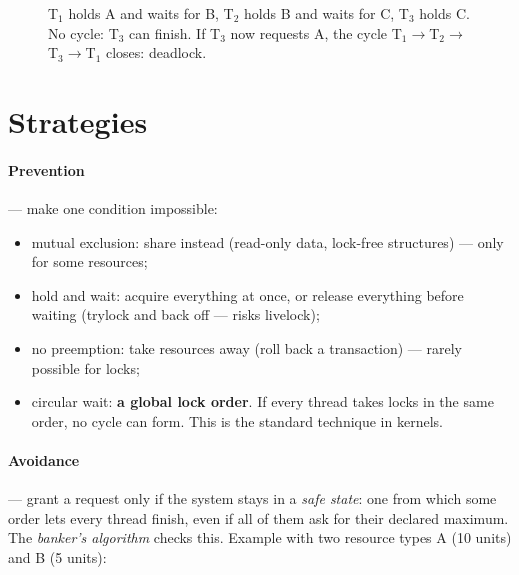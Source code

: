 \begin{figure}[htbp]
\centering
{}
\caption{T$_1$ holds A and waits for B, T$_2$ holds B and waits for C, T$_3$
holds C. No cycle: T$_3$ can finish. If T$_3$ now requests A, the cycle
T$_1\to$T$_2\to$T$_3\to$T$_1$ closes: deadlock.}
\label{fig:rag}
\end{figure}

\section{Strategies}

\paragraph{Prevention} --- make one condition impossible:
\begin{itemize}
  \item mutual exclusion: share instead (read-only data, lock-free
    structures) --- only for some resources;
  \item hold and wait: acquire everything at once, or release everything
    before waiting (trylock and back off --- risks livelock);
  \item no preemption: take resources away (roll back a transaction) ---
    rarely possible for locks;
  \item circular wait: \textbf{a global lock order}. If every thread takes
    locks in the same order, no cycle can form. This is the standard
    technique in kernels.
\end{itemize}

\paragraph{Avoidance} --- grant a request only if the system stays in a
\emph{safe state}: one from which some order lets every thread finish,
even if all of them ask for their declared maximum. The \emph{banker's
algorithm} checks this. Example with two resource types A (10 units) and
B (5 units):

